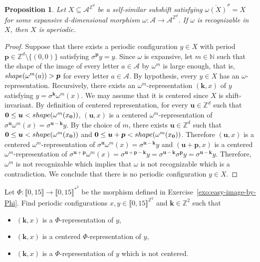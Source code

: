 \documentclass[12pt]{amsart}
\newtheorem{proposition}[definition]{Proposition}
\newcommand{\N}{\mathbb{N}}
\newcommand{\Z}{\mathbb{Z}}
\newcommand{\zero}{{\boldsymbol{0}}}
\newcommand{\bk}{{\boldsymbol{k}}}
\newcommand{\bp}{{\boldsymbol{p}}}
\newcommand{\bu}{{\boldsymbol{u}}}
\newcommand{\Acal}{\mathcal{A}} %
\newcommand{\shiftclosure}[1]{{\overline{#1}^{\sigma}}}
\newcommand{\shape}{\textsc{shape}}
\newcommand{\Zrange}[1]{\llbracket0,#1\rrbracket}
\begin{document}
\begin{proposition}\label{prop:expansive-recognizable-aperiodic}
    Let $X\subseteq\Acal^{\Z^d}$ be a self-similar subshift 
    satisfying $\shiftclosure{\omega(X)}=X$
    for some expansive $d$-dimensional morphism
    $\omega:\Acal\to\Acal^{\Z^d}$.
    If $\omega$ is recognizable in $X$, then $X$ is aperiodic.
\end{proposition}

\begin{proof}
    Suppose that there exists a periodic configuration $y\in X$ with
    period $\bp\in\Z^d\setminus\{(0,0)\}$ satisfying $\sigma^\bp y=y$.
    Since $\omega$ is expansive,
    let $m\in\N$ such that the shape of the image of every letter
    $a\in\Acal$ by $\omega^m$ is large enough, that is,
    $\shape(\omega^m(a))>\bp$ for every
    letter $a\in\Acal$.
    By hypothesis,
    every $y\in X$ has an $\omega$-representation. 
    Recursively, there
    exists an $\omega^m$-representation $(\bk,x)$ of $y$ satisfying
    $y=\sigma^\bk\omega^m(x)$.
    We may assume that it is centered since $X$ is shift-invariant.
    By definition of centered representation,
    for every $\bu\in\Z^d$ such that $\zero\leq\bu<\shape(\omega^m(x_\zero))$,
    $(\bu,x)$ is a centered $\omega^m$-representation of 
    $\sigma^\bu\omega^m(x)=\sigma^{\bu-\bk}y$.
    By the choice of $m$, there exists $\bu\in\Z^d$ such that
    $\zero\leq\bu<\shape(\omega^m(x_\zero))$
    and
    $\zero\leq\bu+\bp<\shape(\omega^m(x_\zero))$.
    Therefore
    $(\bu,x)$ is a centered $\omega^m$-representation of 
    $\sigma^\bu\omega^m(x)=\sigma^{\bu-\bk}y$
    and
    $(\bu+\bp,x)$ is a centered $\omega^m$-representation of 
    $\sigma^{\bu+\bp}\omega^m(x)
    =\sigma^{\bu+\bp-\bk}y
    =\sigma^{\bu-\bk}\sigma^\bp y
    =\sigma^{\bu-\bk}y$.
    Therefore, $\omega^m$ is not recognizable
    which implies that $\omega$ is not recognizable
    which is a contradiction.
    We conclude that there is no periodic configuration $y\in X$.
\end{proof}



\begin{exo}[label={exo:representations}]
    Let $\Phi:\Zrange{15}\to\Zrange{15}^{*^2}$
    be the morphism defined in Exercise~\ref{exo:easy-image-by-Phi}.
    Find periodic configurations
    $x,y\in\Zrange{15}^{\Z^2}$
    and $\bk\in\Z^2$
    such that 
    \begin{itemize}
    \item $(\bk,x)$ is a $\Phi$-representation of $y$,
    \item $(\bk,x)$ is a centered $\Phi$-representation of $y$,
    \item $(\bk,x)$ is a $\Phi$-representation of $y$ which is not centered.
    \end{itemize}
\end{exo}
\end{document}
